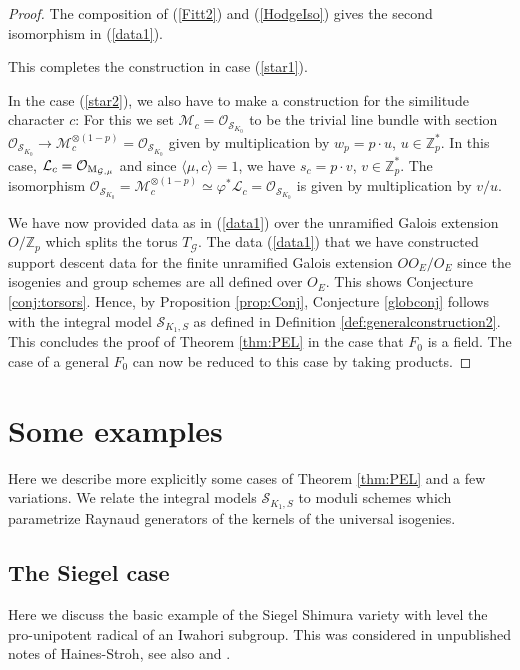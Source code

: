 \documentclass[reqno, 10pt]{amsart}
\newcommand{\BZ}{\ensuremath{\mathbb {Z}}\xspace}
\newcommand{\CG}{\ensuremath{\mathcal {G}}\xspace}
\newcommand{\CL}{\ensuremath{\mathcal {L}}\xspace}
\newcommand{\CM}{\ensuremath{\mathcal {M}}\xspace}
\newcommand{\CO}{\ensuremath{\mathcal {O}}\xspace}
\newcommand{\CS}{\ensuremath{\mathcal {S}}\xspace}
\theoremstyle{definition}
\numberwithin{equation}{subsection}
\numberwithin{subsubsection}{subsection}
\newcommand{\Mloc}{{\rm M}}
\begin{document}
\begin{proof}
     
 The composition of (\ref{Fitt2}) and (\ref{HodgeIso})   gives the second isomorphism in (\ref{data1}). 
 
 This completes the construction in case (\ref{star1}). 
 
 In the case (\ref{star2}), we also have to make a construction for the similitude character $c$: For this we set $\CM_c=\CO_{\CS_{K_0}}$ to be the trivial line bundle with section $\CO_{\CS_{K_0}}\xrightarrow{} \CM_c^{\otimes (1-p)}=\CO_{\CS_{K_0}}$ 
 given by multiplication by $w_p=p\cdot u$, $u\in \BZ_p^*$. In this case, $\CL_c=\CO_{\Mloc_{\CG,\mu}}$ and since 
 $\langle \mu, c\rangle=1$, we have $s_c=p\cdot v$, $v\in \BZ_p^*$. The isomorphism $\CO_{\CS_{K_0}}=\CM_c^{\otimes (1-p)}\simeq \varphi^*\CL_c=\CO_{\CS_{K_0}}$ is given by multiplication by $v/u$.
 
We have now provided data as in (\ref{data1}) over the unramified Galois extension $O/\BZ_p$ which splits the torus $T_\CG$. The data (\ref{data1}) that we have constructed  support descent data for the finite unramified Galois extension $OO_E/O_E$ since 
the isogenies and group schemes are all defined over $O_E$.  This  shows Conjecture \ref{conj:torsors}. Hence, by Proposition \ref{prop:Conj}, Conjecture \ref{globconj} follows with the integral model $\CS_{K_1, S}$ as defined in Definition \ref{def:generalconstruction2}. This concludes the proof of Theorem \ref{thm:PEL} in the case that $F_0$ is a field.  The  case of a general $F_0$ can now be reduced to this case by taking products.
 \end{proof}
  
 
  

\section{Some examples}\label{s:PELex}

Here we describe more explicitly some cases of Theorem  \ref{thm:PEL} and a few variations. We relate the integral models $\CS_{K_1,S}$ to moduli schemes which parametrize Raynaud generators of the kernels of the universal isogenies. 



 
 
   
   \subsection{The Siegel case} \label{ss:Siegel}
    Here we discuss the basic example of the Siegel Shimura variety with level the pro-unipotent radical of an Iwahori subgroup. This was considered in unpublished notes of Haines-Stroh, see also \cite{HLS}  and \cite{Shadrach}. 
    
\end{document}
